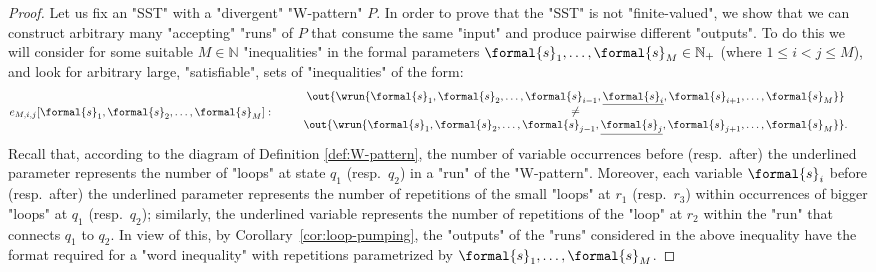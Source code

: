 \documentclass{theoretics}
\begin{document}
\begin{proof}
Let us fix an "SST" with a "divergent" "W-pattern" $P$.
In order to prove that the "SST" is not "finite-valued", we show that we can construct
arbitrary many "accepting" "runs" 
of $P$ that consume the 
same "input" and produce pairwise different "outputs".
To do this we will consider for some suitable $M \in \mathbb{N}$
"inequalities" in the formal parameters 
$\formal{s}_1, \ldots, \formal{s}_M \in \mathbb{N}_+$ (where $1 \leq i < j \leq M$),
and look for arbitrary large, "satisfiable", sets of "inequalities" of the form:
\begin{align*}
    &e_{M,i,j}[\formal{s}_1,\formal{s}_2, \ldots, \formal{s}_M]: %
    \quad\left.
    \begin{array}{ccc}
         & \out{\wrun{\formal{s}_1,\formal{s}_2,\ldots,\formal{s}_{i-1},\underline{\formal{s}_{i}},\formal{s}_{i+1}, \ldots ,\formal{s}_M}}\\
         & \neq\\
         & \out{\wrun{\formal{s}_1,\formal{s}_2,\ldots,\formal{s}_{j-1},\underline{\formal{s}_{j}},\formal{s}_{j+1}, \ldots ,\formal{s}_M}}.
    \end{array}
    \right.
\end{align*}
Recall that, according to the diagram of Definition \ref{def:W-pattern},
the number of variable occurrences before (resp.~after) the underlined parameter 
represents the number of "loops" at state $q_1$ (resp.~$q_2$) in a "run" of the "W-pattern".
Moreover, each variable $\formal{s}_i$ before (resp.~after) the underlined parameter 
represents the number of repetitions of the small "loops" at $r_1$ (resp.~$r_3$) within 
occurrences of bigger "loops" at $q_1$ (resp.~$q_2$); similarly, the underlined
variable represents the number of repetitions of the "loop" at $r_2$ within
the "run" that connects $q_1$ to $q_2$.
In view of this, by Corollary~\ref{cor:loop-pumping}, the "outputs" of the "runs" 
considered in the above inequality have the format required for a "word inequality" 
with repetitions parametrized by $\formal{s}_1, \ldots, \formal{s}_M$.


\end{proof}
\end{document}
